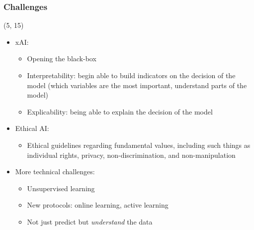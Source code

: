 \begin{frame}
  \frametitle{Challenges}

  \begin{textblock}{90}(5, 15)
    \begin{itemize}
    \item<1-> \acl{xAI}:
      \begin{itemize}
      \item Opening the black-box
      \item Interpretability: begin able to build indicators on the decision of the model
        (which variables are the most important, understand parts of the model)
      \item Explicability: being able to explain the decision of the model
      \end{itemize}
    \item<2-> Ethical \ac{AI}:
      \begin{itemize}
      \item Ethical guidelines regarding fundamental values, including such things as individual rights, privacy, non-discrimination, and non-manipulation
      \end{itemize}
    \item<3-> More technical challenges:
      \begin{itemize}
      \item Unsupervised learning
      \item New protocols: online learning, active learning
      \item Not just predict but \emph{understand} the data
      \end{itemize}
    \end{itemize}
  \end{textblock}
\end{frame}
